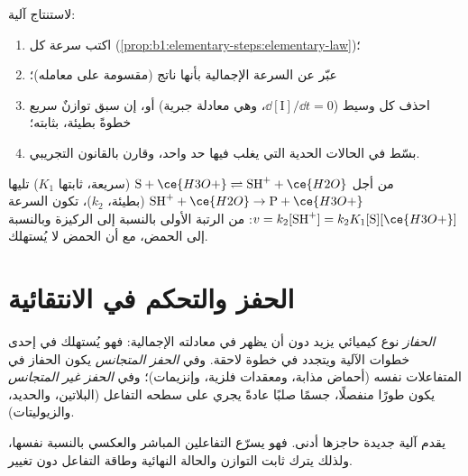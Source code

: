 \begin{method}\label{met:b1:elementary-steps:rate-law}
لاستنتاج  آلية:
\begin{enumerate}
  \item اكتب سرعة كل  (\cref{prop:b1:elementary-steps:elementary-law})؛
  \item عبّر عن السرعة الإجمالية بأنها  ناتج
        (مقسومة على معامله)؛
  \item احذف كل وسيط 
        ($\dd[\mathrm{I}]/\dd t = 0$، وهي معادلة جبرية) أو، إن سبق
        توازنٌ سريع خطوةً بطيئة، بثابته؛
  \item بسّط في الحالات الحدية التي يغلب فيها حد واحد، وقارن
        بالقانون التجريبي.
\end{enumerate}
\end{method}

\begin{example}\label{ex:b1:elementary-steps:acid}
من أجل $\mathrm{S} + \ce{H3O+} \rightleftharpoons \mathrm{SH}^+ + \ce{H2O}$ (سريعة،
ثابتها $K_1$) تليها $\mathrm{SH}^+ + \ce{H2O} \to \mathrm{P} + \ce{H3O+}$ (بطيئة،
$k_2$)، تكون السرعة $v = k_2[\mathrm{SH}^+] = k_2K_1[\mathrm{S}][\ce{H3O+}]$:
من الرتبة الأولى بالنسبة إلى الركيزة وبالنسبة إلى الحمض، مع أن الحمض لا يُستهلك.
\end{example}

\section{الحفز والتحكم في الانتقائية}

\begin{definition}\label{def:b1:elementary-steps:catalyst}
\emph{الحفاز} نوع كيميائي يزيد  دون أن يظهر في معادلته الإجمالية: فهو يُستهلك في إحدى
خطوات الآلية ويتجدد في خطوة لاحقة. وفي
\emph{الحفز المتجانس} يكون الحفاز
في  المتفاعلات نفسه (أحماض مذابة، ومعقدات فلزية،
وإنزيمات)؛ وفي \emph{الحفز غير المتجانس}
يكون طورًا منفصلًا، جسمًا صلبًا عادةً يجري على سطحه
التفاعل (البلاتين، والحديد، والزيوليتات).
\end{definition}

\begin{proposition}\label{prop:b1:elementary-steps:catalysis}
يقدم  آلية جديدة حاجزها أدنى. فهو يسرّع
التفاعلين المباشر والعكسي بالنسبة نفسها، ولذلك يترك
ثابت التوازن والحالة النهائية وطاقة التفاعل
دون تغيير.
\end{proposition}

